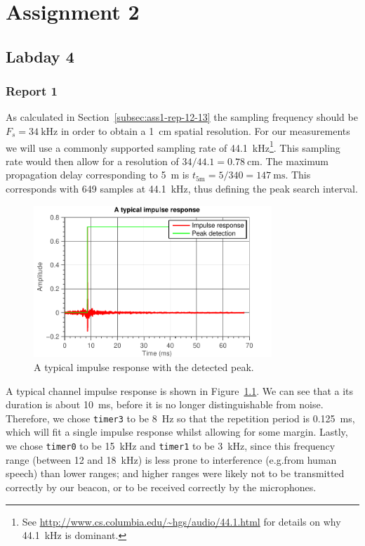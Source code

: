\documentclass[11pt,titlepage]{report}
\begin{document}
\chapter{Assignment 2}
\section{Labday 4}

\subsection{Report 1}
\label{subsec:ass2-report-1}
As calculated in Section~\ref{subsec:ass1-rep-12-13} the sampling frequency should be $F_s=\SI{34}{\kilo\hertz}$ in order to obtain a \SI{1}{\centi\meter} spatial resolution. For our measurements we will use a commonly supported sampling rate of \SI{44.1}{\kilo\hertz}\footnote{See \url{http://www.cs.columbia.edu/~hgs/audio/44.1.html} for details on why \SI{44.1}{\kilo\hertz} is dominant.}. This sampling rate would then allow for a resolution of $34 / 44.1 = \SI{0.78}{\centi\meter}$. The maximum propagation delay corresponding to \SI{5}{\meter} is $t_{\text{5m}}=5/340=\SI{147}{\milli\second}$. This corresponds with \num{649} samples at \SI{44.1}{\kilo\hertz}, thus defining the peak search interval.

\begin{figure}[H]
	\centering
	\includegraphics[width=0.8\textwidth]{../../deliverable-7-resources/figures/ass-2/report-1/ass-2-report-1.pdf}
	\caption{A typical impulse response with the detected peak.}
	\label{fig:ass-2-rep-1-typical}
\end{figure}

A typical channel impulse response is shown in Figure~\ref{fig:ass-2-rep-1-typical}. We can see that a its duration is about \SI{10}{\milli\second}, before it is no longer distinguishable from noise. Therefore, we chose \texttt{timer3} to be \SI{8}{\hertz} so that the repetition period is \SI{0.125}{\milli\second}, which will fit a single impulse response whilst allowing for some margin. Lastly, we chose \texttt{timer0} to be \SI{15}{kHz} and \texttt{timer1} to be \SI{3}{kHz}, since this frequency range (between \num{12} and \SI{18}{kHz}) is less prone to interference (e.g.from human speech) than lower ranges; and higher ranges were likely not to be transmitted correctly by our beacon, or to be received correctly by the microphones.
\end{document}
